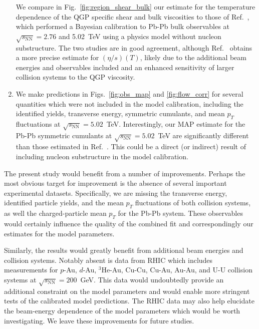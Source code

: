 \documentclass[aps,prc,reprint,amsmath,nofootinbib]{revtex4-1}
\newcommand{\sqrts}{\sqrt{s_\mathrm{NN}}}
\begin{document}
\begin{enumerate}[itemsep=0pt, leftmargin=2\parindent]
    We compare in Fig.~\ref{fig:region_shear_bulk} our estimate for the temperature dependence of the QGP specific shear and bulk viscosities to those of Ref.~\cite{Bernhard:2018hnz}, which performed a Bayesian calibration to Pb-Pb bulk observables at $\sqrts=2.76$ and 5.02~TeV using a physics model without nucleon substructure.
    The two studies are in good agreement, although Ref.~\cite{Bernhard:2018hnz} obtains a more precise estimate for $(\eta/s)(T)$, likely due to the additional beam energies and observables included and an enhanced sensitivity of larger collision systems to the QGP viscosity.
  \item
    We make predictions in Figs.~\ref{fig:obs_map} and \ref{fig:flow_corr} for several quantities which were not included in the model calibration, including the identified yields, transverse energy, symmetric cumulants, and mean $p_T$ fluctuations at $\sqrts=5.02$~TeV.
    Interestingly, our MAP estimate for the Pb-Pb symmetric cumulants at $\sqrts=5.02$~TeV are significantly different than those estimated in Ref.~\cite{Bernhard:2018hnz}.
    This could be a direct (or indirect) result of including nucleon substructure in the model calibration.
\end{enumerate}

The present study would benefit from a number of improvements.
Perhaps the most obvious target for improvement is the absence of several important experimental datasets.
Specifically, we are missing the transverse energy, identified particle yields, and the mean $p_T$ fluctuations of both collision systems, as well the charged-particle mean $p_T$ for the Pb-Pb system.
These observables would certainly influence the quality of the combined fit and correspondingly our estimates for the model parameters.

Similarly, the results would greatly benefit from additional beam energies and collision systems.
Notably absent is data from RHIC which includes measurements for $p$-Au, $d$-Au, $^3$He-Au, Cu-Cu, Cu-Au, Au-Au, and \mbox{U-U} collision systems at $\sqrts=200$~GeV.
This data would undoubtedly provide an additional constraint on the model parameters and would enable more stringent tests of the calibrated model predictions.
The RHIC data may also help elucidate the beam-energy dependence of the model parameters which would be worth investigating.
We leave these improvements for future studies.

\medskip
\end{document}
